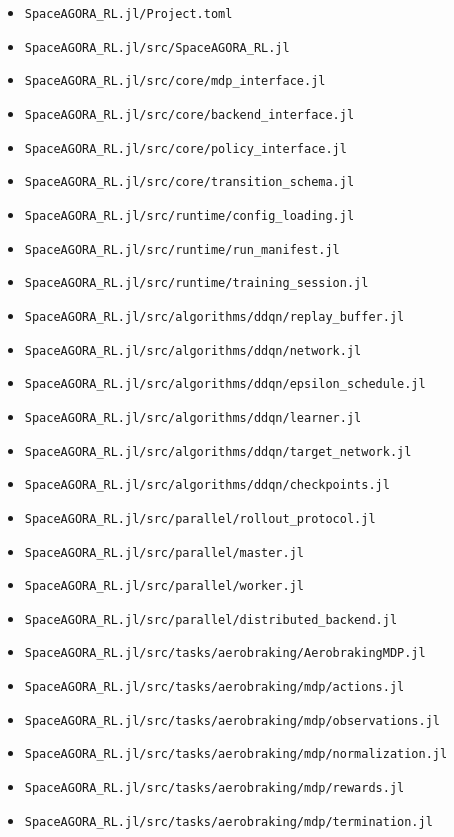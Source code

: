 \documentclass[11pt]{article}
\begin{document}
\begin{itemize}
\item \texttt{SpaceAGORA\_RL.jl/Project.toml}
\item \texttt{SpaceAGORA\_RL.jl/src/SpaceAGORA\_RL.jl}
\item \texttt{SpaceAGORA\_RL.jl/src/core/mdp\_interface.jl}
\item \texttt{SpaceAGORA\_RL.jl/src/core/backend\_interface.jl}
\item \texttt{SpaceAGORA\_RL.jl/src/core/policy\_interface.jl}
\item \texttt{SpaceAGORA\_RL.jl/src/core/transition\_schema.jl}
\item \texttt{SpaceAGORA\_RL.jl/src/runtime/config\_loading.jl}
\item \texttt{SpaceAGORA\_RL.jl/src/runtime/run\_manifest.jl}
\item \texttt{SpaceAGORA\_RL.jl/src/runtime/training\_session.jl}
\item \texttt{SpaceAGORA\_RL.jl/src/algorithms/ddqn/replay\_buffer.jl}
\item \texttt{SpaceAGORA\_RL.jl/src/algorithms/ddqn/network.jl}
\item \texttt{SpaceAGORA\_RL.jl/src/algorithms/ddqn/epsilon\_schedule.jl}
\item \texttt{SpaceAGORA\_RL.jl/src/algorithms/ddqn/learner.jl}
\item \texttt{SpaceAGORA\_RL.jl/src/algorithms/ddqn/target\_network.jl}
\item \texttt{SpaceAGORA\_RL.jl/src/algorithms/ddqn/checkpoints.jl}
\item \texttt{SpaceAGORA\_RL.jl/src/parallel/rollout\_protocol.jl}
\item \texttt{SpaceAGORA\_RL.jl/src/parallel/master.jl}
\item \texttt{SpaceAGORA\_RL.jl/src/parallel/worker.jl}
\item \texttt{SpaceAGORA\_RL.jl/src/parallel/distributed\_backend.jl}
\item \texttt{SpaceAGORA\_RL.jl/src/tasks/aerobraking/AerobrakingMDP.jl}
\item \texttt{SpaceAGORA\_RL.jl/src/tasks/aerobraking/mdp/actions.jl}
\item \texttt{SpaceAGORA\_RL.jl/src/tasks/aerobraking/mdp/observations.jl}
\item \texttt{SpaceAGORA\_RL.jl/src/tasks/aerobraking/mdp/normalization.jl}
\item \texttt{SpaceAGORA\_RL.jl/src/tasks/aerobraking/mdp/rewards.jl}
\item \texttt{SpaceAGORA\_RL.jl/src/tasks/aerobraking/mdp/termination.jl}

\end{itemize}
\end{document}
